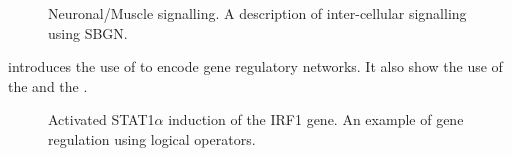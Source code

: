\begin{figure}[htb]
\begin{center}
\caption{Neuronal/Muscle signalling. A description of inter-cellular signalling using SBGN.}\label{fig:muscle}
\end{center}
\end{figure}

 introduces the use of \SBGNPDLone to encode gene regulatory networks. It also show the use of the   and the  .

\begin{figure}[htb]
\begin{center}
\caption{Activated STAT1$\alpha$ induction of the IRF1 gene. An example of gene regulation using logical operators.}\label{fig:IFN}
\end{center}
\end{figure}
